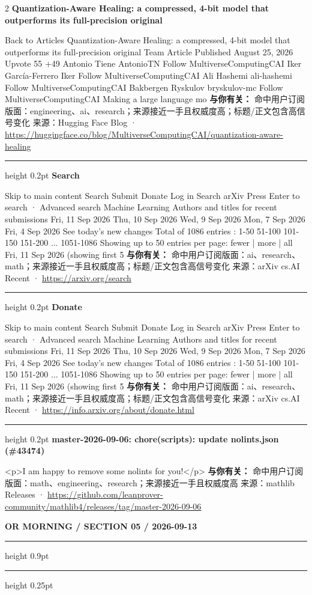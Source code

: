 \documentclass[10.5pt]{ctexart}
\begin{document}
\begin{multicols}{2}
{\large\bfseries Quantization-Aware Healing: a compressed, 4-bit model that outperforms its full-precision original}\par
Back to Articles Quantization-Aware Healing: a compressed, 4-bit model that outperforms its full-precision original Team Article Published August 25, 2026 Upvote 55 +49 Antonio Tiene AntonioTN Follow MultiverseComputingCAI Iker García-Ferrero Iker Follow MultiverseComputingCAI Ali Hashemi ali-hashemi Follow MultiverseComputingCAI Bakbergen Ryskulov bryskulov-mc Follow MultiverseComputingCAI Making a large language mo
\textbf{与你有关：} 命中用户订阅版面：engineering、ai、research；来源接近一手且权威度高；标题/正文包含高信号变化
{\footnotesize\color{ormuted} 来源：Hugging Face Blog · \url{https://huggingface.co/blog/MultiverseComputingCAI/quantization-aware-healing}}
\vspace{2mm}
\hrule height 0.2pt
\vspace{2mm}
{\large\bfseries Search}\par
Skip to main content Search Submit Donate Log in Search arXiv Press Enter to search · Advanced search Machine Learning Authors and titles for recent submissions Fri, 11 Sep 2026 Thu, 10 Sep 2026 Wed, 9 Sep 2026 Mon, 7 Sep 2026 Fri, 4 Sep 2026 See today's new changes Total of 1086 entries : 1-50 51-100 101-150 151-200 ... 1051-1086 Showing up to 50 entries per page: fewer | more | all Fri, 11 Sep 2026 (showing first 5
\textbf{与你有关：} 命中用户订阅版面：ai、research、math；来源接近一手且权威度高；标题/正文包含高信号变化
{\footnotesize\color{ormuted} 来源：arXiv cs.AI Recent · \url{https://arxiv.org/search}}
\vspace{2mm}
\hrule height 0.2pt
\vspace{2mm}
{\large\bfseries Donate}\par
Skip to main content Search Submit Donate Log in Search arXiv Press Enter to search · Advanced search Machine Learning Authors and titles for recent submissions Fri, 11 Sep 2026 Thu, 10 Sep 2026 Wed, 9 Sep 2026 Mon, 7 Sep 2026 Fri, 4 Sep 2026 See today's new changes Total of 1086 entries : 1-50 51-100 101-150 151-200 ... 1051-1086 Showing up to 50 entries per page: fewer | more | all Fri, 11 Sep 2026 (showing first 5
\textbf{与你有关：} 命中用户订阅版面：ai、research、math；来源接近一手且权威度高；标题/正文包含高信号变化
{\footnotesize\color{ormuted} 来源：arXiv cs.AI Recent · \url{https://info.arxiv.org/about/donate.html}}
\vspace{2mm}
\hrule height 0.2pt
\vspace{2mm}
{\large\bfseries master-2026-09-06: chore(scripts): update nolints.json (\#43474)}\par
<p>I am happy to remove some nolints for you!</p>
\textbf{与你有关：} 命中用户订阅版面：math、engineering、research；来源接近一手且权威度高
{\footnotesize\color{ormuted} 来源：mathlib Releases · \url{https://github.com/leanprover-community/mathlib4/releases/tag/master-2026-09-06}}
\end{multicols}
\newpage
{\small\bfseries OR MORNING / SECTION 05 / 2026-09-13}
\vspace{2mm}
\hrule height 0.9pt
\vspace{1.5mm}
\hrule height 0.25pt
\vspace{4mm}
\end{document}
